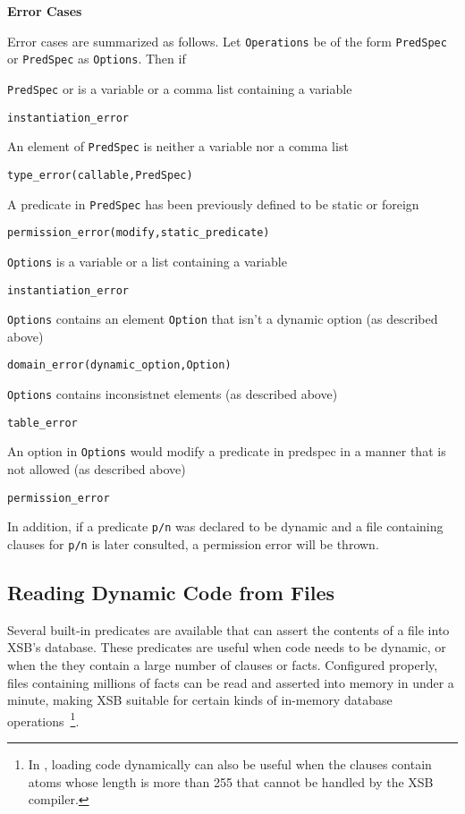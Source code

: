 \begin{description}
{\bf Error Cases} 

Error cases are summarized as follows.  Let {\tt Operations} be of the
form {\tt PredSpec} or {\tt PredSpec} as {\tt Options}.  Then if 
%
\bi
\item {\tt PredSpec} or is a variable or a comma list containing a variable
\bi
\item {\tt instantiation\_error}
\ei
\item An element of {\tt PredSpec} is neither a variable nor a comma
  list
\bi
\item 	{\tt type\_error(callable,PredSpec)}
\ei
\item 	A predicate in {\tt PredSpec} has been previously defined to be static or foreign
\bi
\item 	{\tt permission\_error(modify,static\_predicate)}
\ei
\item {\tt Options} is a variable or a list containing a variable
\bi
\item {\tt instantiation\_error}
\ei
\item {\tt Options} contains an element {\tt Option} that isn't a dynamic option (as described above)
\bi
\item {\tt domain\_error(dynamic\_option,Option)}
\ei
\item {\tt Options} contains inconsistnet elements (as described above)
\bi
\item {\tt table\_error}
\ei
\item An option in {\tt Options} would modify a predicate in predspec
  in a manner that is not allowed (as described above)
\bi
\item {\tt permission\_error}
\ei
\ei

In addition, if a predicate {\tt p/n} was declared to be dynamic and a
file containing clauses for {\tt p/n} is later consulted, a permission
error will be thrown.

\end{description}

\subsection{Reading Dynamic Code from Files} \label{sec:LoadDyn}

Several built-in predicates are available that can assert the contents
of a file into XSB's database.  These predicates are useful when code
needs to be dynamic, or when the they contain a large number of
clauses or facts.  Configured properly, files containing millions of
facts can be read and asserted into memory in under a minute, making
XSB suitable for certain kinds of in-memory database
operations~\footnote{In \version{}, loading code dynamically can also
be useful when the clauses contain atoms whose length is more than 255
that cannot be handled by the XSB compiler.}.  

